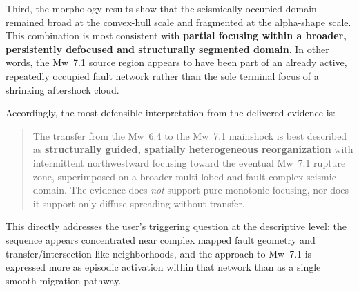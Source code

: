 \documentclass[11pt]{article}
\begin{document}
Third, the morphology results show that the seismically occupied domain remained broad at the convex-hull scale and fragmented at the alpha-shape scale. This combination is most consistent with \textbf{partial focusing within a broader, persistently defocused and structurally segmented domain}. In other words, the Mw~7.1 source region appears to have been part of an already active, repeatedly occupied fault network rather than the sole terminal focus of a shrinking aftershock cloud.

Accordingly, the most defensible interpretation from the delivered evidence is:
\begin{quote}
The transfer from the Mw~6.4 to the Mw~7.1 mainshock is best described as \textbf{structurally guided, spatially heterogeneous reorganization} with intermittent northwestward focusing toward the eventual Mw~7.1 rupture zone, superimposed on a broader multi-lobed and fault-complex seismic domain. The evidence does \emph{not} support pure monotonic focusing, nor does it support only diffuse spreading without transfer.
\end{quote}

This directly addresses the user's triggering question at the descriptive level: the sequence appears concentrated near complex mapped fault geometry and transfer/intersection-like neighborhoods, and the approach to Mw~7.1 is expressed more as episodic activation within that network than as a single smooth migration pathway.
\end{document}
